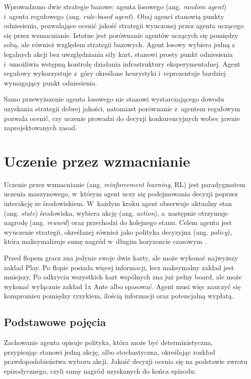 Wprowadzono dwie strategie bazowe: agenta losowego (ang.
\emph{random agent}) i~agenta regułowego (ang. \emph{rule-based agent}).
Obaj agenci stanowią punkty odniesienia, pozwalające ocenić
jakość strategii wyuczonej przez agenta uczącego się przez wzmacnianie.
Istotne jest porównanie agentów uczących się pomiędzy sobą, ale
również względem strategii bazowych. Agent losowy wybiera jedną z~
legalnych akcji bez uwzględniania siły kart, stanowi prosty punkt
odniesienia i~umożliwia wstępną kontrolę działania infrastruktury
eksperymentalnej. Agent regułowy wykorzystuje z~góry określone heurystyki
i~reprezentuje bardziej wymagający punkt odniesienia.

Samo przewyższenie agenta losowego nie stanowi wystarczającego dowodu
uzyskania strategii dobrej jakości, natomiast porównanie z~agentem regułowym
pozwala ocenić, czy uczenie prowadzi do decyzji konkurencyjnych wobec
jawnie zaprojektowanych zasad.

\section{Uczenie przez wzmacnianie}

Uczenie przez wzmacnianie (ang. \emph{reinforcement learning}, RL) jest
paradygmatem uczenia maszynowego, w~którym agent uczy się podejmowania
decyzji poprzez interakcję ze środowiskiem. W~każdym kroku agent obserwuje
aktualny stan (ang. \emph{state}) środowiska, wybiera akcję (ang.
\emph{action}), a~następnie otrzymuje nagrodę (ang. \emph{reward}) oraz
przechodzi do kolejnego stanu. Celem agenta jest wyuczenie strategii,
określanej również jako polityka decyzyjna (ang. \emph{policy}), która
maksymalizuje sumę nagród w~długim horyzoncie czasowym
\cite{sutton_barto_rl}.

Przed flopem gracz
zna jedynie swoje dwie karty, ale może wykonać najwyższy zakład Play. Po
flopie posiada więcej informacji, lecz maksymalny zakład jest mniejszy. Po
odkryciu wszystkich kart wspólnych zna już pełny board, ale może wykonać
wyłącznie zakład 1x Ante albo spasować. Agent musi więc nauczyć się
kompromisu pomiędzy ryzykiem, ilością informacji oraz potencjalną wypłatą.

\subsection{Podstawowe pojęcia}

Zachowanie agenta opisuje polityka, która może być deterministyczna,
przypisując stanowi jedną akcję, albo stochastyczna, określając rozkład
prawdopodobieństwa wyboru akcji. Jakość decyzji ocenia się na podstawie
zwrotu epizodycznego, czyli sumy nagród uzyskanych
do końca epizodu:

